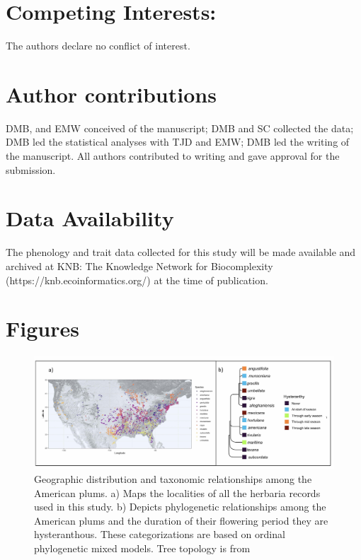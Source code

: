\documentclass{article}[12pt]
\begin{document}
{\section*{Competing Interests:}
The authors declare no conflict of interest.

\section*{Author contributions}
DMB, and EMW conceived of the manuscript; DMB and SC collected the data; DMB led the statistical analyses with TJD and EMW; DMB led the writing of the manuscript. All authors contributed to writing and gave approval for the submission.

\section*{Data Availability}
The phenology and trait data collected for this study will be made available and archived at KNB: The Knowledge Network for Biocomplexity (https://knb.ecoinformatics.org/) at the time of publication.


 

\newpage
\section*{Figures}


\begin{figure}[h!]
  \centering
 \includegraphics[width=\textwidth]{..//..//Plots/fig1_new.jpg}
    \caption{Geographic distribution and taxonomic relationships among the American plums. a) Maps the localities of all the herbaria records used in this study. b) Depicts phylogenetic relationships among the American plums and the duration of their flowering period they are hysteranthous. These categorizations are based on ordinal phylogenetic mixed models. Tree topology is from \citet{Shaw:2004aa}}
    \label{fig:phylo2}
\end{figure}



}
\end{document}
